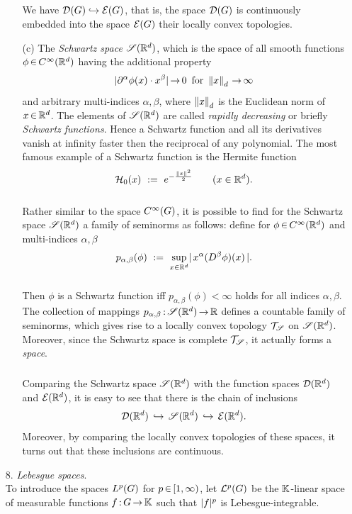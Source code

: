 \documentclass[11pt,twoside]{article}
\begin{document}
\begin{itemize}[leftmargin=12pt,itemsep=5pt]
\begin{itemize}[leftmargin=17pt]
\subparagraph{}
We have $\D(\G) \hookrightarrow \E(\G)$,
that is,
the space $\D(\G)$ is continuously embedded into the space $\E(\G)$
{\wrt} their locally convex topologies.

\item[(c)]
The \textit{Schwartz space} $\SRd$,
which is the space of all smooth functions $\phi \xeof C^{\infty}(\Rd)$
having the additional property
\[
\abs{ \PA \phi(x) \cdot x^{\beta}} \xto 0 \,
\for \norm{x}_d \xto \infty
\]
and arbitrary multi-indices $\alpha,\beta$,
where $\norm{x}_d$ is the Euclidean norm of $x \xeof \Rd$.
The elements of $\SRd$ are called \textit{rapidly decreasing}
or briefly \textit{Schwartz functions}.
Hence a Schwartz function and all its derivatives vanish at infinity
faster then the reciprocal of any polynomial.
The most famous example of a Schwartz function is the Hermite function
\[
\cal{H}_0(x) \, \eqdef \, e^{- \frac{\norm{x}^2}{2}} \quad \quad (x \in \Rd).
\]

\subparagraph{}
Rather similar to the space $\SF$,
it is possible to find for the Schwartz space $\SRd$
a family of seminorms as follows:
define for $\phi \xeof C^{\infty}(\Rd)$ and multi-indices $\alpha, \beta$
\begin{equation}\label{I_SRN_FAMILY_OF_SEMINORMS}
p_{\alpha,\beta}(\phi) \, \eqdef \,
\sup_{x \in \Rd} \abs{ \, x^{\alpha} (D^{\beta} \phi) (x) \, } .
\end{equation}

\subparagraph{}
Then $\phi$ is a Schwartz function
iff $p_{\alpha,\beta}(\phi) < \infty$
holds for all indices $\alpha, \beta$.
The collection of mappings $p_{\alpha,\beta}\:\SRd \xto \R$
defines a countable family of seminorms,
which gives rise to a locally convex topology $\topT_{\mathscr{S}}$ on $\SRd$.
Moreover,
since the Schwartz space is complete {\wrt} $\topT_{\mathscr{S}}$,
it actually forms a \textit{{\FRECHET} space}.

\subparagraph{}
Comparing the Schwartz space $\SRd$ with the function spaces
$\D(\Rd)$ and $\E(\Rd)$,
it is easy to see that there is the chain of inclusions
\[
\D(\Rd) \, \hookrightarrow \, \SRd \, \hookrightarrow \, \cal{E}(\Rd).
\]
Moreover,
by comparing the locally convex topologies of these spaces,
it turns out that these inclusions are continuous.
\end{itemize}

\item[8.] \textit{Lebesgue spaces}.\\
To introduce the spaces $L^p(G)$ for $p {\,\in\,} [1,\infty)$,
let ${\mathcal{L}}^p(G)$ be the ${\mathbb{K}}$-linear space of measurable functions
$f{\,:\,}G {\,\to\,} {\mathbb{K}}$
such that $\abs{f} ^p$ is Lebesgue-integrable.


\end{itemize}
\end{document}
